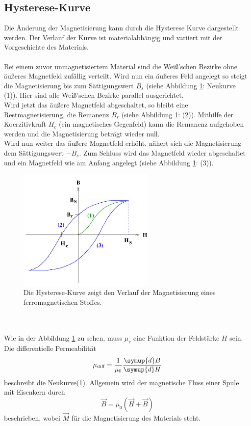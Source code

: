 \subsection{Hysterese-Kurve}
Die Änderung der Magnetisierung kann durch die Hysterese Kurve dargestellt werden. Der Verlauf der Kurve ist materialabhängig und
variiert mit der Vorgeschichte des Materials.\\ \\
Bei einem zuvor unmagnetisiertem Material sind die Weiß'schen Bezirke ohne äußeres Magnetfeld zufällig verteilt. Wird nun ein äußeres Feld angelegt so
steigt die Magnetisierung bis zum Sättigungswert $B_s$ (siehe Abbildung \ref{fig:hysterese}: Neukurve (1)). Hier sind alle Weiß'schen Bezirke parallel ausgerichtet.\\
Wird jetzt das äußere Magnetfeld abgeschaltet, so bleibt eine Restmagnetisierung, die Remanenz $B_r$ (siehe Abbildung \ref{fig:hysterese}: (2)).
Mithilfe der Koerzitivkraft $H_c$ (ein magnetisches Gegenfeld) kann die Remanenz aufgehoben werden und die Magnetisierung beträgt wieder null.\\
Wird nun weiter das äußere Magnetfeld erhöht, nähert sich die Magnetisierung dem Sättigungswert $-B_s$. Zum Schluss wird das Magnetfeld wieder abgeschaltet und ein Magnetfeld
wie am Anfang angelegt (siehe Abbildung \ref{fig:hysterese}: (3)).
\begin{figure}
    \centering
    \includegraphics[height=6cm]{content/hysterese.jpg}
    \caption{Die Hysterese-Kurve zeigt den Verlauf der Magnetisierung eines ferromagnetischen Stoffes. \cite[3]{anleitung}}
    \label{fig:hysterese}
\end{figure}
\\
\\
Wie in der Abbildung \ref{fig:hysterese} zu sehen, muss $\mu_r$ eine Funktion der Feldstärke $H$ sein.
Die differentielle Permeabilität
\begin{equation}
    \mu_\text{diff} = \frac{1}{\mu_0} \frac{\symup{d}B}{\symup{d}H}
\end{equation}
beschreibt die Neukurve(1). Allgemein wird der magnetische Fluss einer Spule mit Eisenkern durch
\begin{equation}
    \vec{B} = \mu_0 \left( \vec{H} + \vec{B} \right)
\end{equation}
beschrieben, wobei $\vec{M}$ für die Magnetisierung des Materials steht.
